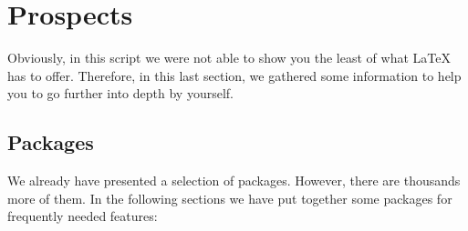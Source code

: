 \chapter{Prospects}
\label{sec:prospects}

Obviously, in this script we were not able to show you the least of what \LaTeX{} has to offer. 
Therefore, in this last section, we gathered some information to help you to go further into depth by yourself.

\section{Packages}

We already have presented a selection of packages. However, there are thousands more of them. In the following sections we have put together some packages for frequently needed features: 


